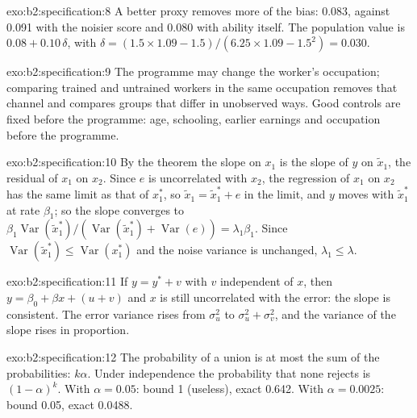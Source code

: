 \begin{solution}{exo:b2:specification:8}
A better proxy removes more of the bias: 0.083, against 0.091 with the noisier score and 0.080 with ability itself. The
population value is $0.08 + 0.10\,\delta$, with $\delta = (1.5 \times 1.09 - 1.5)/(6.25 \times 1.09 - 1.5^2) = 0.030$.
\end{solution}

\begin{solution}{exo:b2:specification:9}
The programme may change the worker's occupation; comparing trained and untrained workers in the same occupation removes
that channel and compares groups that differ in unobserved ways. Good controls are fixed before the programme: age,
schooling, earlier earnings and occupation before the programme.
\end{solution}

\begin{solution}{exo:b2:specification:10}
By the theorem the slope on $x_1$ is the slope of $y$ on $\tilde x_1$, the residual of $x_1$ on $x_2$. Since $e$ is
uncorrelated with $x_2$, the regression of $x_1$ on $x_2$ has the same limit as that of $x_1^*$, so $\tilde x_1 = \tilde
x_1^* + e$ in the limit, and $y$ moves with
$\tilde x_1^*$ at rate $\beta_1$; so the slope converges to $\beta_1\operatorname{Var}(\tilde x_1^*)/(\operatorname{Var}(\tilde x_1^*) + \operatorname{Var}(e)) = \lambda_1\beta_1$.
Since $\operatorname{Var}(\tilde x_1^*) \leq \operatorname{Var}(x_1^*)$ and the noise variance is unchanged, $\lambda_1 \leq
\lambda$.
\end{solution}

\begin{solution}{exo:b2:specification:11}
If $y = y^* + v$ with $v$ independent of $x$, then $y = \beta_0 + \beta x + (u + v)$ and $x$ is still uncorrelated with the
error: the slope is consistent. The error variance rises from $\sigma_u^2$ to $\sigma_u^2 + \sigma_v^2$, and the variance
of the slope rises in proportion.
\end{solution}

\begin{solution}{exo:b2:specification:12}
The probability of a union is at most the sum of the probabilities: $k\alpha$. Under independence the probability that
none rejects is $(1 - \alpha)^k$. With $\alpha = 0.05$: bound 1 (useless), exact 0.642. With $\alpha = 0.0025$: bound
0.05, exact 0.0488.
\end{solution}

